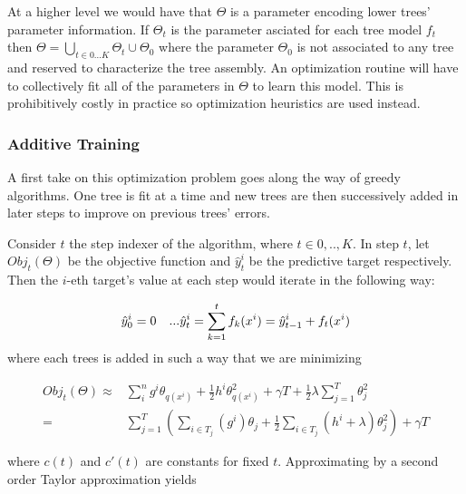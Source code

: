 At a higher level we would have that $\Theta$ is a parameter encoding lower trees' parameter information. If $\Theta_t$ is the parameter asciated for each tree model $f_t$ then $\Theta =  \bigcup_{t \in {0...K}} \Theta_t  \cup \Theta_0$ where the parameter $\Theta_0$ is not associated to any tree and reserved to characterize the tree assembly. An optimization routine will have to collectively fit all of the parameters in $\Theta$ to learn this model. This is prohibitively costly in practice so optimization heuristics are used instead. 

\subsubsection{Additive Training}

A first take on this optimization problem goes along the way of greedy algorithms. One tree is fit at a time and new trees are then successively added in later steps to improve on previous trees' errors.

Consider $t$ the step indexer of the algorithm, where $t \in {0,..,K}$. In step $t$, let $Obj_t(\Theta)$ be the objective function and $\hat{y}_t^i$ be the predictive target respectively. Then the $i$-eth target's value at each step would iterate in the following way:

\begin{equation} \label{eq:gb-targetSteps}
\hat{y}_0^i = 0 \\
\ \ \ ... \\ 
\hat{y}_t^i = \sum_{k=1}^{t} f_k(x^i) = \hat{y}_{t-1}^i +  f_t(x^i)
\end{equation}
where each trees is added in such a way that we are minimizing

\[
\begin{split}
Obj_t(\Theta) \approx &  \sum_i^n {g^i \theta_{q(x^i)} + \frac{1}{2} h^i \theta_{q(x^i)}^2 } + \gamma T + \frac{1}{2}\lambda \sum_{j=1}^T\theta_j^2 \\
=  & \sum_{j=1}^T\left(  \sum_{i \in T_j} (g^i )\theta_{j} + \frac{1}{2} \sum_{i \in T_j} (h^i + \lambda ) \theta_{j}^2  \right) + \gamma T
\end{split}
\]

where $c(t)$ and $c'(t)$ are constants for fixed $t$. Approximating by a second order Taylor approximation yields


